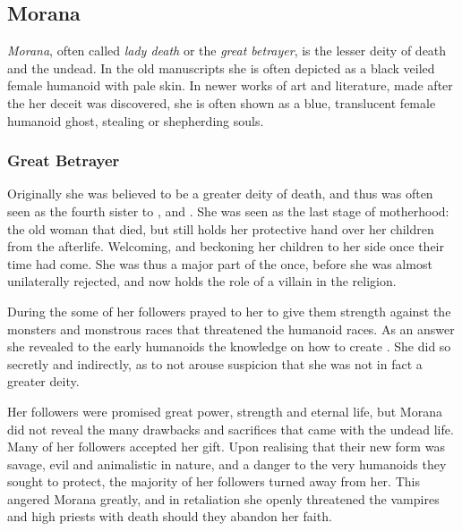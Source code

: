 \subsection{Morana}
\label{sec:Morana}


\emph{Morana}, often called \emph{lady death} or the \emph{great betrayer}, is
the lesser deity of death and the undead. In the old manuscripts she is often
depicted as a black veiled female humanoid with pale skin. In newer works of
art and literature, made after the her deceit was discovered, she is often
shown as a blue, translucent female humanoid ghost, stealing or shepherding
souls.

\subsubsection{Great Betrayer}
\label{sec:Great Betrayer}

Originally she was believed to be a greater deity of death, and thus was often
seen as the fourth sister to ,  and
. She was seen as the last stage of motherhood: the old
woman that died, but still holds her protective hand over her children from
the afterlife. Welcoming, and beckoning her children to her side once their
time had come. She was thus a major part of the  once,
before she was almost unilaterally rejected, and now holds the role of a
villain in the religion.

During the  some of her followers prayed to her to
give them strength against the monsters and monstrous races that threatened
the humanoid races. As an answer she revealed to the early humanoids the
knowledge on how to create . She did so secretly and
indirectly, as to not arouse suspicion that she was not in fact a greater
deity.

Her followers were promised great power, strength and eternal life, but Morana
did not reveal the many drawbacks and sacrifices that came with the undead
life. Many of her followers accepted her gift. Upon realising that their new
form was savage, evil and animalistic in nature, and a danger to the very
humanoids they sought to protect, the majority of her followers turned away
from her. This angered Morana greatly, and in retaliation she openly
threatened the vampires and high priests with death should they abandon her
faith.

